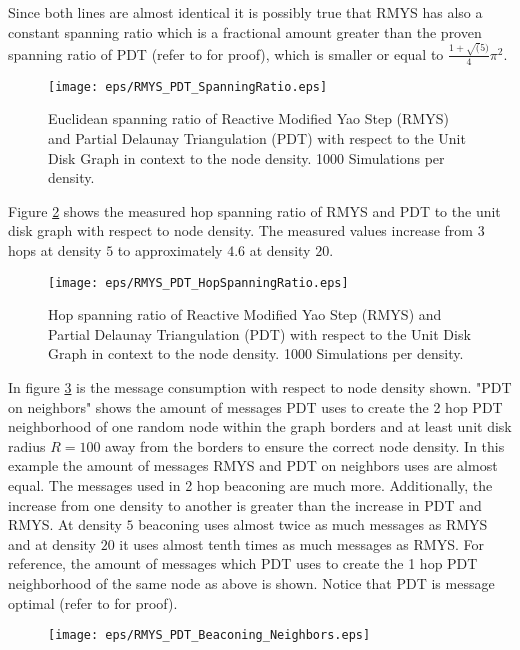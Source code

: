 Since both lines are almost identical it is possibly true that RMYS has also a constant spanning ratio which is a fractional amount greater than the proven spanning ratio of PDT (refer to \cite{Neumann2012} for proof), which is smaller or equal to $\frac{1+\sqrt(5)}{4} \pi^2 $. 

\begin{figure}[h!]
\centering
\texttt{[image: eps/RMYS\_PDT\_SpanningRatio.eps]}
\caption{Euclidean spanning ratio of Reactive Modified Yao Step (RMYS) and Partial Delaunay Triangulation (PDT) with respect to the Unit Disk Graph in context to the node density. 1000 Simulations per density.}
\label{fig:RMYS_PDT_SpanningRatio}
\end{figure}


Figure \ref{fig:RMYS_PDT_HopSpanningRatio} shows the measured hop spanning ratio of RMYS and PDT to the unit disk graph with respect to node density.
The measured values increase from $3 $ hops at density $5 $ to approximately $4.6 $ at density $20 $.

\begin{figure}[h!]
\centering
\texttt{[image: eps/RMYS\_PDT\_HopSpanningRatio.eps]}
\caption{Hop spanning ratio of Reactive Modified Yao Step (RMYS) and Partial Delaunay Triangulation (PDT) with respect to the Unit Disk Graph in context to the node density. 1000 Simulations per density.}
\label{fig:RMYS_PDT_HopSpanningRatio}
\end{figure}



In figure \ref{fig:RMYS_PDT_Beaconing_Neighbors.eps} is the message consumption with respect to node density shown.
"PDT on neighbors" shows the amount of messages PDT uses to create the 2 hop PDT neighborhood of one random node within the graph borders and at least unit disk radius $R=100 $ away from the borders to ensure the correct node density.
In this example the amount of messages RMYS and PDT on neighbors uses are almost equal.
The messages used in 2 hop beaconing are much more.
Additionally, the increase from one density to another is greater than the increase in PDT and RMYS.
At density $5 $ beaconing uses almost twice as much messages as RMYS and at density $20 $ it uses almost tenth times as much messages as RMYS.
For reference, the amount of messages which PDT uses to create the 1 hop PDT neighborhood of the same node as above is shown.
Notice that PDT is message optimal (refer to \cite{Benter2013} for proof).

\begin{figure}[h!]
\centering
\texttt{[image: eps/RMYS\_PDT\_Beaconing\_Neighbors.eps]}
\caption{}
\label{fig:RMYS_PDT_Beaconing_Neighbors.eps}
\end{figure}

